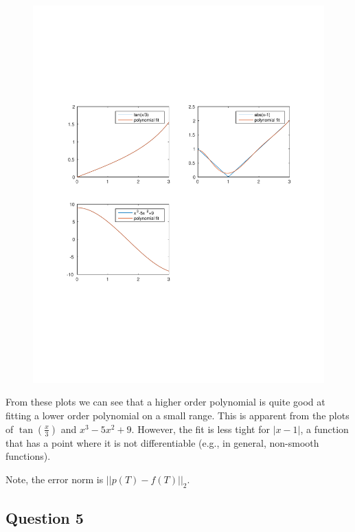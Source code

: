 \begin{figure}[th]
  \centering
\includegraphics[trim=10mm 70mm 10mm 70mm, width=1.0\textwidth]{../q4_plots}
\end{figure}

From these plots we can see that a higher order polynomial is quite good at fitting a lower order polynomial on a small range.
This is apparent from the plots of \(\tan(\frac{x}{3})\) and \(x^{3}-5x^{2}+9\).
However, the fit is less tight for \(|x-1|\), a function that has a point where it is not differentiable (e.g., in general, non-smooth functions).

Note, the error norm is \(||p(T)-f(T)||_2\).


\newpage


\newpage
\subsection{Question 5}
